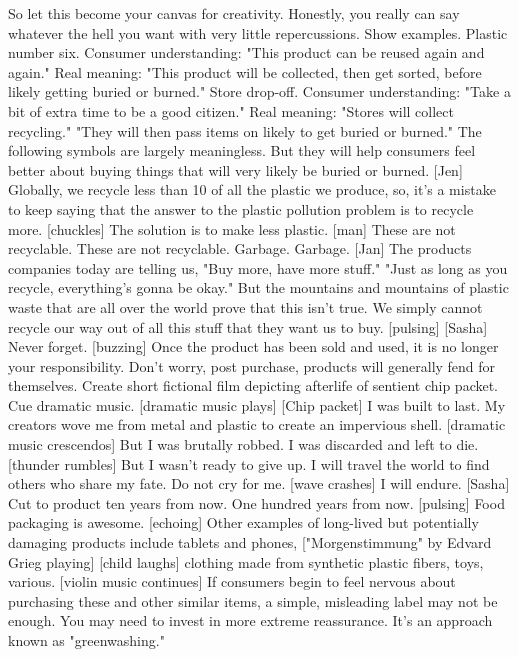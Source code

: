\documentclass[a4paper]{article}
\begin{document}
	So let this become your canvas for creativity.
	Honestly, you really can say whatever the hell you want
	with very little repercussions.
	Show examples.
	Plastic number six.
	Consumer understanding:
	"This product can be reused again and again."
	Real meaning: "This product will be collected, then get sorted,
	before likely getting buried
	or burned."
	Store drop-off.
	Consumer understanding:
	"Take a bit of extra time to be a good citizen."
	Real meaning: "Stores will collect recycling."
	"They will then pass items on
	likely to get buried
	or burned."
	The following symbols are largely meaningless.
	But they will help consumers feel better about buying things
	that will very likely be buried or burned.
	[Jen] Globally, we recycle less than 10%
	of all the plastic we produce,
	so, it's a mistake to keep saying
	that the answer to the plastic pollution problem
	is to recycle more.
	[chuckles] The solution is to make less plastic.
	[man] These are not recyclable.
	These are not recyclable.
	Garbage.
	Garbage.
	[Jan] The products companies today are telling us,
	"Buy more, have more stuff."
	"Just as long as you recycle, everything's gonna be okay."
	But the mountains and mountains of plastic waste
	that are all over the world prove that this isn't true.
	We simply cannot recycle our way
	out of all this stuff that they want us to buy.
	[pulsing]
	[Sasha] Never forget.
	[buzzing]
	Once the product has been sold and used, it is no longer your responsibility.
	Don't worry,
	post purchase, products will generally fend for themselves.
	Create short fictional film depicting afterlife of sentient chip packet.
	Cue dramatic music.
	[dramatic music plays]
	[Chip packet] I was built to last.
	My creators wove me from metal and plastic
	to create an impervious shell.
	[dramatic music crescendos]
	But I was brutally robbed.
	I was discarded and left to die.
	[thunder rumbles]
	But I wasn't ready to give up.
	I will travel the world
	to find others who share my fate.
	Do not cry for me.
	[wave crashes]
	I will endure.
	[Sasha] Cut to product ten years from now.
	One hundred years from now.
	[pulsing]
	Food packaging is awesome. [echoing]
	Other examples of long-lived but potentially damaging products include
	tablets and phones,
	["Morgenstimmung" by Edvard Grieg playing]
	[child laughs]
	clothing made from synthetic plastic fibers,
	toys, various.
	[violin music continues]
	If consumers begin to feel nervous
	about purchasing these and other similar items,
	a simple, misleading label may not be enough.
	You may need to invest in more extreme reassurance.
	It's an approach known as "greenwashing."
\end{document}
